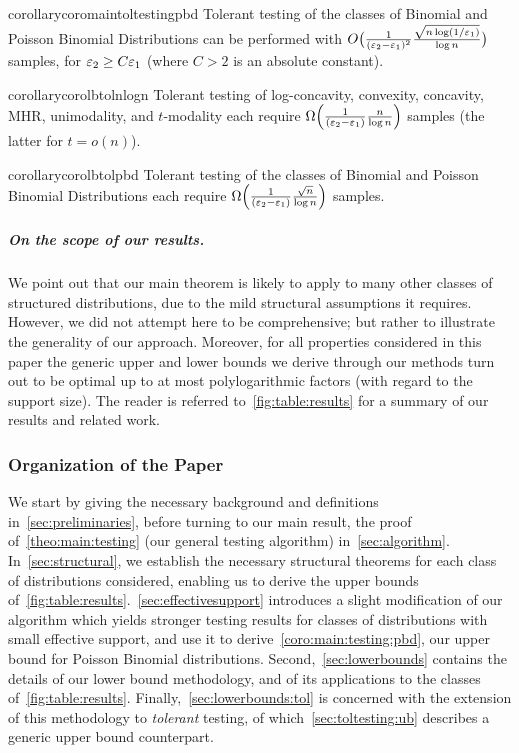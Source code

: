 \begin{restatable}{corollary}{coromaintoltestingpbd}\label{coro:main:tol:testing:pbd}
Tolerant testing of the classes of Binomial and Poisson Binomial Distributions can be performed with $O\big( \frac{1}{(\varepsilon_2-\varepsilon_1)^2}\frac{\sqrt{n\log({1}/{\varepsilon_1})}}{\log n} \big)$ samples, for $\varepsilon_2 \geq C \varepsilon_1$ (where $C>2$ is an absolute constant).
\end{restatable}

\begin{restatable}{corollary}{corolbtolnlogn}\label{coro:tol:lb:nlogn}
  Tolerant testing of log-concavity, convexity, concavity, MHR, unimodality, and $t$-modality each require $\bigOmega{\frac{1}{(\eps_2-\eps_1)}\frac{n}{\log n}}$ samples (the latter for $t = o(n)$).
\end{restatable}

\begin{restatable}{corollary}{corolbtolpbd}\label{coro:lb:tol:pbd}
  Tolerant testing of the classes of Binomial and Poisson Binomial Distributions each require $\bigOmega{\frac{1}{(\eps_2-\eps_1)}\frac{\sqrt{n}}{\log n}}$ samples.
\end{restatable}

\subparagraph{On the scope of our results.} We point out that our main theorem is likely to apply to many other classes of structured distributions, 
due to the mild structural assumptions it requires. However, we did not attempt here to be comprehensive; but rather to illustrate the generality of our approach. Moreover, for all properties considered in this paper the generic upper and lower bounds we derive through our methods turn out to be optimal up to at most polylogarithmic factors (with regard to the support size). The reader is referred to~\cref{fig:table:results} for a summary of our results and related work.

\subsubsection{Organization of the Paper}

We start by giving the necessary background and definitions in~\cref{sec:preliminaries}, before turning to our main result, the proof of~\cref{theo:main:testing} (our general testing algorithm) in~\cref{sec:algorithm}. In~\cref{sec:structural}, we establish the necessary structural theorems for each class of distributions considered, enabling us to derive the upper bounds of~\cref{fig:table:results}.~\cref{sec:effectivesupport} introduces a slight modification of our algorithm which yields stronger testing results for classes of distributions with small effective support, and use it to derive~\cref{coro:main:testing:pbd}, our upper bound for Poisson Binomial distributions. Second,~\cref{sec:lowerbounds} contains the details of our lower bound methodology, and of its applications to the classes of~\cref{fig:table:results}. Finally,~\cref{sec:lowerbounds:tol} is concerned with the extension of this methodology to \emph{tolerant} testing, of which~\cref{sec:toltesting:ub} describes a generic upper bound counterpart.
 
